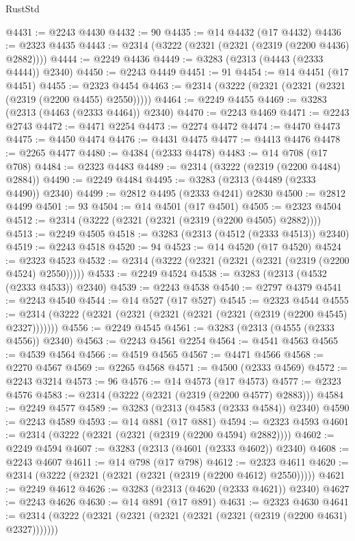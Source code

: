 \begin{lexlean}{RustStd}
\begin{coremodule}
@4431 := @2243 @4430
@4432 := 90
@4435 := @14 @4432 (@17 @4432)
@4436 := @2323 @4435
@4443 := @2314 (@3222 (@2321 (@2321 (@2319 (@2200 @4436) @2882))))
@4444 := @2249 @4436
@4449 := @3283 (@2313 (@4443 (@2333 @4444)) @2340)
@4450 := @2243 @4449
@4451 := 91
@4454 := @14 @4451 (@17 @4451)
@4455 := @2323 @4454
@4463 := @2314 (@3222 (@2321 (@2321 (@2321 (@2319 (@2200 @4455) @2550)))))
@4464 := @2249 @4455
@4469 := @3283 (@2313 (@4463 (@2333 @4464)) @2340)
@4470 := @2243 @4469
@4471 := @2243 @2743
@4472 := @4471 @2254
@4473 := @2274 @4472
@4474 := @4470 @4473
@4475 := @4450 @4474
@4476 := @4431 @4475
@4477 := @4413 @4476
@4478 := @2265 @4477
@4480 := @4384 (@2333 @4478)
@4483 := @14 @708 (@17 @708)
@4484 := @2323 @4483
@4489 := @2314 (@3222 (@2319 (@2200 @4484) @2884))
@4490 := @2249 @4484
@4495 := @3283 (@2313 (@4489 (@2333 @4490)) @2340)
@4499 := @2812 @4495 (@2333 @4241) @2830
@4500 := @2812 @4499
@4501 := 93
@4504 := @14 @4501 (@17 @4501)
@4505 := @2323 @4504
@4512 := @2314 (@3222 (@2321 (@2321 (@2319 (@2200 @4505) @2882))))
@4513 := @2249 @4505
@4518 := @3283 (@2313 (@4512 (@2333 @4513)) @2340)
@4519 := @2243 @4518
@4520 := 94
@4523 := @14 @4520 (@17 @4520)
@4524 := @2323 @4523
@4532 := @2314 (@3222 (@2321 (@2321 (@2321 (@2319 (@2200 @4524) @2550)))))
@4533 := @2249 @4524
@4538 := @3283 (@2313 (@4532 (@2333 @4533)) @2340)
@4539 := @2243 @4538
@4540 := @2797 @4379
@4541 := @2243 @4540
@4544 := @14 @527 (@17 @527)
@4545 := @2323 @4544
@4555 := @2314 (@3222 (@2321 (@2321 (@2321 (@2321 (@2321 (@2319 (@2200 @4545) @2327)))))))
@4556 := @2249 @4545
@4561 := @3283 (@2313 (@4555 (@2333 @4556)) @2340)
@4563 := @2243 @4561 @2254
@4564 := @4541 @4563
@4565 := @4539 @4564
@4566 := @4519 @4565
@4567 := @4471 @4566
@4568 := @2270 @4567
@4569 := @2265 @4568
@4571 := @4500 (@2333 @4569)
@4572 := @2243 @3214
@4573 := 96
@4576 := @14 @4573 (@17 @4573)
@4577 := @2323 @4576
@4583 := @2314 (@3222 (@2321 (@2319 (@2200 @4577) @2883)))
@4584 := @2249 @4577
@4589 := @3283 (@2313 (@4583 (@2333 @4584)) @2340)
@4590 := @2243 @4589
@4593 := @14 @881 (@17 @881)
@4594 := @2323 @4593
@4601 := @2314 (@3222 (@2321 (@2321 (@2319 (@2200 @4594) @2882))))
@4602 := @2249 @4594
@4607 := @3283 (@2313 (@4601 (@2333 @4602)) @2340)
@4608 := @2243 @4607
@4611 := @14 @798 (@17 @798)
@4612 := @2323 @4611
@4620 := @2314 (@3222 (@2321 (@2321 (@2321 (@2319 (@2200 @4612) @2550)))))
@4621 := @2249 @4612
@4626 := @3283 (@2313 (@4620 (@2333 @4621)) @2340)
@4627 := @2243 @4626
@4630 := @14 @891 (@17 @891)
@4631 := @2323 @4630
@4641 := @2314 (@3222 (@2321 (@2321 (@2321 (@2321 (@2321 (@2319 (@2200 @4631) @2327)))))))

\end{coremodule}
\end{lexlean}
